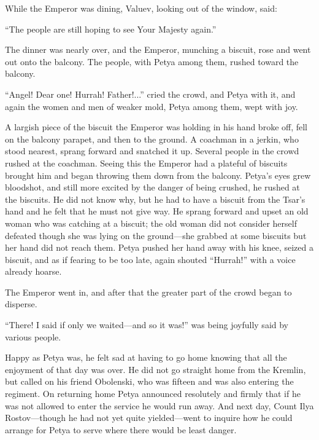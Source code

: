 While the Emperor was dining, Valuev, looking out of the window,
said:

``The people are still hoping to see Your Majesty again.''

The dinner was nearly over, and the Emperor, munching a biscuit,
rose and went out onto the balcony. The people, with Petya among
them, rushed toward the balcony.

``Angel! Dear one! Hurrah! Father!...'' cried the crowd, and
Petya with it, and again the women and men of weaker mold, Petya
among them, wept with joy.

A largish piece of the biscuit the Emperor was holding in his
hand broke off, fell on the balcony parapet, and then to the
ground. A coachman in a jerkin, who stood nearest, sprang forward
and snatched it up. Several people in the crowd rushed at the
coachman. Seeing this the Emperor had a plateful of biscuits
brought him and began throwing them down from the
balcony. Petya's eyes grew bloodshot, and still more excited by
the danger of being crushed, he rushed at the biscuits. He did
not know why, but he had to have a biscuit from the Tsar's hand
and he felt that he must not give way. He sprang forward and
upset an old woman who was catching at a biscuit; the old woman
did not consider herself defeated though she was lying on the
ground---she grabbed at some biscuits but her hand did not reach
them. Petya pushed her hand away with his knee, seized a biscuit,
and as if fearing to be too late, again shouted ``Hurrah!'' with
a voice already hoarse.

The Emperor went in, and after that the greater part of the crowd
began to disperse.

``There! I said if only we waited---and so it was!'' was being
joyfully said by various people.

Happy as Petya was, he felt sad at having to go home knowing that
all the enjoyment of that day was over. He did not go straight
home from the Kremlin, but called on his friend Obolenski, who
was fifteen and was also entering the regiment. On returning home
Petya announced resolutely and firmly that if he was not allowed
to enter the service he would run away. And next day, Count Ilya
Rostov---though he had not yet quite yielded---went to inquire
how he could arrange for Petya to serve where there would be
least danger.


